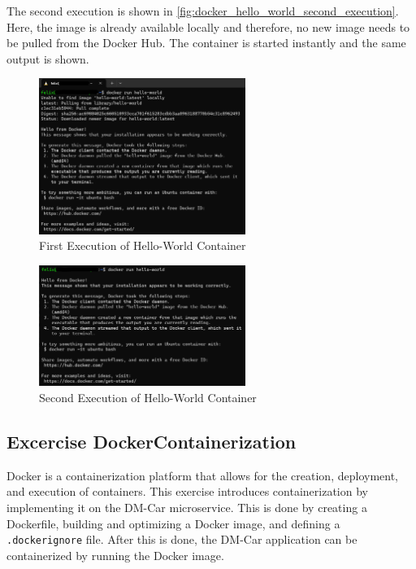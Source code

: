 The second execution is shown in \autoref*{fig:docker_hello_world_second_execution}.
Here, the image is already available locally and therefore, no new image needs to be pulled from the Docker Hub.
The container is started instantly and the same output is shown.

\begin{figure}
    \centering
    \includegraphics[width=0.6\textwidth]{figures/microservices/dmCar/ms_dmCar_dockerHelloWorldFirstExecution.png}
    \caption{First Execution of Hello-World Container}
    \label{fig:docker_hello_world_first_execution}
\end{figure}

\begin{figure}
    \centering
    \includegraphics[width=0.6\textwidth]{figures/microservices/dmCar/ms_dmCar_dockerHelloWorldSecondExecution.png}
    \caption{Second Execution of Hello-World Container}
    \label{fig:docker_hello_world_second_execution}
\end{figure}


\subsection{Excercise DockerContainerization}
Docker is a containerization platform that allows for the creation, deployment, and execution of containers.
This exercise introduces containerization by implementing it on the DM-Car microservice.
This is done by creating a Dockerfile, building and optimizing a Docker image, and defining a \texttt{.dockerignore} file.
After this is done, the DM-Car application can be containerized by running the Docker image.

